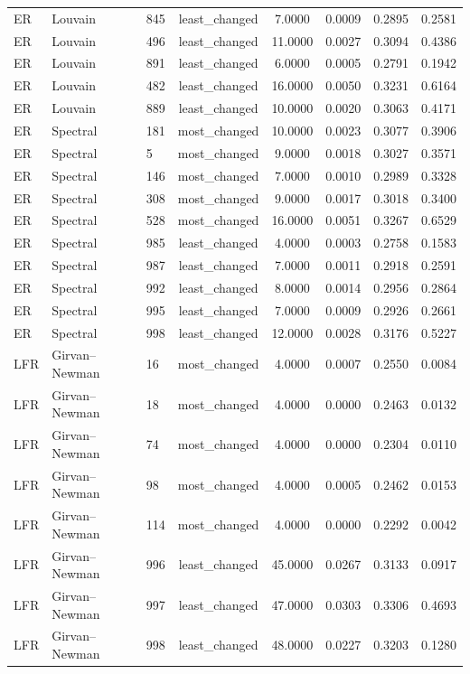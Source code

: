 \begin{longtable}{lllccccc}
ER & Louvain & 845 & least\_changed & 7.0000 & 0.0009 & 0.2895 & 0.2581 \\
ER & Louvain & 496 & least\_changed & 11.0000 & 0.0027 & 0.3094 & 0.4386 \\
ER & Louvain & 891 & least\_changed & 6.0000 & 0.0005 & 0.2791 & 0.1942 \\
ER & Louvain & 482 & least\_changed & 16.0000 & 0.0050 & 0.3231 & 0.6164 \\
ER & Louvain & 889 & least\_changed & 10.0000 & 0.0020 & 0.3063 & 0.4171 \\
ER & Spectral & 181 & most\_changed & 10.0000 & 0.0023 & 0.3077 & 0.3906 \\
ER & Spectral & 5 & most\_changed & 9.0000 & 0.0018 & 0.3027 & 0.3571 \\
ER & Spectral & 146 & most\_changed & 7.0000 & 0.0010 & 0.2989 & 0.3328 \\
ER & Spectral & 308 & most\_changed & 9.0000 & 0.0017 & 0.3018 & 0.3400 \\
ER & Spectral & 528 & most\_changed & 16.0000 & 0.0051 & 0.3267 & 0.6529 \\
ER & Spectral & 985 & least\_changed & 4.0000 & 0.0003 & 0.2758 & 0.1583 \\
ER & Spectral & 987 & least\_changed & 7.0000 & 0.0011 & 0.2918 & 0.2591 \\
ER & Spectral & 992 & least\_changed & 8.0000 & 0.0014 & 0.2956 & 0.2864 \\
ER & Spectral & 995 & least\_changed & 7.0000 & 0.0009 & 0.2926 & 0.2661 \\
ER & Spectral & 998 & least\_changed & 12.0000 & 0.0028 & 0.3176 & 0.5227 \\
LFR & Girvan--Newman & 16 & most\_changed & 4.0000 & 0.0007 & 0.2550 & 0.0084 \\
LFR & Girvan--Newman & 18 & most\_changed & 4.0000 & 0.0000 & 0.2463 & 0.0132 \\
LFR & Girvan--Newman & 74 & most\_changed & 4.0000 & 0.0000 & 0.2304 & 0.0110 \\
LFR & Girvan--Newman & 98 & most\_changed & 4.0000 & 0.0005 & 0.2462 & 0.0153 \\
LFR & Girvan--Newman & 114 & most\_changed & 4.0000 & 0.0000 & 0.2292 & 0.0042 \\
LFR & Girvan--Newman & 996 & least\_changed & 45.0000 & 0.0267 & 0.3133 & 0.0917 \\
LFR & Girvan--Newman & 997 & least\_changed & 47.0000 & 0.0303 & 0.3306 & 0.4693 \\
LFR & Girvan--Newman & 998 & least\_changed & 48.0000 & 0.0227 & 0.3203 & 0.1280 \\

\end{longtable}
